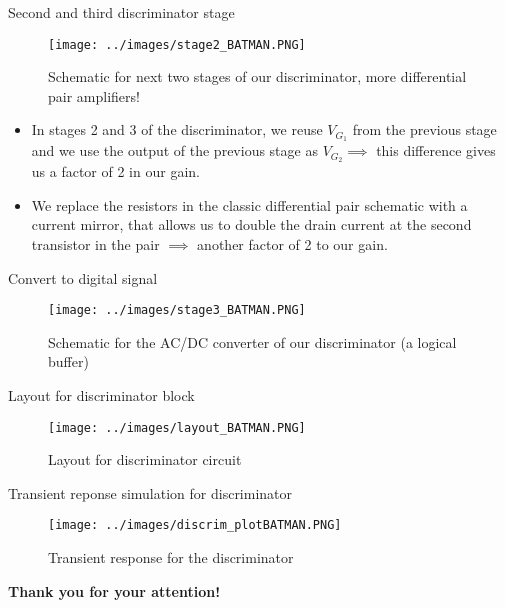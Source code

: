 \documentclass[aspectratio=169,xcolor=dvipsnames]{beamer}
\begin{document}
	\begin{frame}{Second and third discriminator stage}
		\begin{figure}[h!]
			\centering
			\texttt{[image: ../images/stage2\_BATMAN.PNG]}
			\label{diffPairBATMAN2}
			\caption{Schematic for next two stages of our discriminator, more differential pair amplifiers!}
		\end{figure}
		\begin{block}{}
			\begin{itemize}
				\item In stages 2 and 3 of the discriminator, we reuse $V_{G_1}$ from the previous stage and we use the output of the previous stage as $V_{G_2} \implies$ this difference gives us a factor of 2 in our gain.
				\item We replace the resistors in the classic differential pair schematic with a current mirror, that allows us to double the drain current at the second transistor in the pair $\implies$ another factor of 2 to our gain.
			\end{itemize}
		\end{block}
	\end{frame}
	
	\begin{frame}{Convert to digital signal}
		\begin{figure}[h!]
			\centering
			\texttt{[image: ../images/stage3\_BATMAN.PNG]}
			\label{stageBATMAN3}
			\caption{Schematic for the AC/DC converter of our discriminator (a logical buffer)}
		\end{figure}
	\end{frame}
	
	\begin{frame}{Layout for discriminator block}
		\begin{figure}[h!]
			\centering
			\texttt{[image: ../images/layout\_BATMAN.PNG]}
			\label{layoutBATMAN}
			\caption{Layout for discriminator circuit}
		\end{figure}
	\end{frame}
	
	\begin{frame}{Transient reponse simulation for discriminator}
		\begin{figure}[h!]
			\centering
			\texttt{[image: ../images/discrim\_plotBATMAN.PNG]}
			\label{plotBATMAN}
			\caption{Transient response for the discriminator}
		\end{figure}
	\end{frame}
	
	\begin{frame}
		\Huge{\centerline{\textbf{Thank you for your attention!}}}
	\end{frame}
	
	
\end{document}
